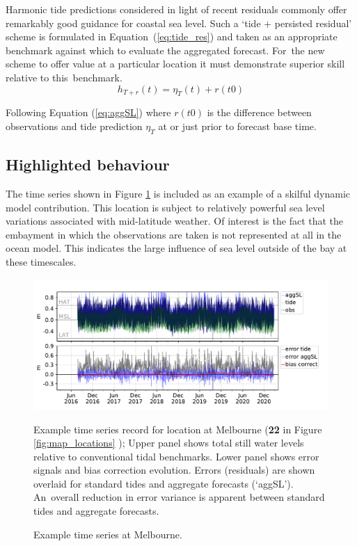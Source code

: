 Harmonic tide predictions considered in light of recent residuals commonly offer remarkably good guidance for coastal sea level.
Such a `tide + persisted residual' scheme is formulated in Equation~(\ref{eq:tide_res}) and taken as an appropriate benchmark against which to evaluate the aggregated forecast.
For~the new scheme to offer value at a particular location it must demonstrate superior skill relative to this~benchmark.  
\begin{equation}
h_{T+r}(t) = \eta_{T}(t) + r(t0)
\label{eq:tide_res}
\end{equation}

Following Equation (\ref{eq:aggSL}) where $r(t0)$ is the difference between observations and tide prediction $\eta_{T}$ at or just prior to forecast base time. 

\subsection{Highlighted behaviour}
The time series shown in Figure \ref{fig:ts_melb} is included as an example of a skilful dynamic model contribution.  
This location is subject to relatively powerful sea level variations associated with mid-latitude weather.
Of interest is the fact that the embayment in which the observations are taken is not represented at all in the ocean model.  This indicates the large influence of sea level outside of the bay at these timescales. 

\begin{figure}[H]
    \centering
    \includegraphics[width=\figwidthFull]{figures/plots/586204_verify_ts.pdf}
    \caption{Example time series at Melbourne.}
    {Example time series record for location at Melbourne (\textbf{22} in Figure \ref{fig:map_locations} ); Upper panel shows total still water levels relative to conventional tidal benchmarks. Lower panel shows error signals and bias correction evolution.  Errors (residuals) are shown overlaid for standard tides and aggregate forecasts (`aggSL').  An~overall reduction in error variance is apparent between standard tides and aggregate forecasts.}
\label{fig:ts_melb}
\end{figure}   


